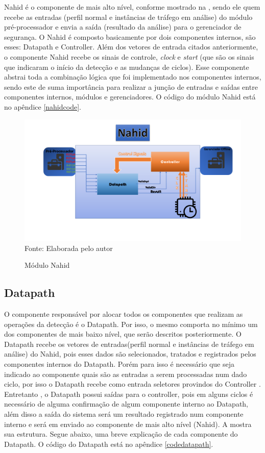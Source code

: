 Nahid é o componente de mais alto nível, conforme mostrado na , sendo ele quem recebe as entradas (perfil normal e instâncias de tráfego em análise) do módulo pré-processador e envia a saída (resultado da análise) para o gerenciador de segurança. O Nahid é composto basicamente por dois componentes  internos, são esses: Datapath e Controller.  Além dos vetores de entrada citados anteriormente, o componente  Nahid recebe os sinais de controle, \textit{clock} e \textit{start} (que são os sinais que indicaram o início da detecção e as mudanças de ciclos). Esse componente  abstrai toda a combinação lógica que foi implementado nos componentes  internos, sendo este de suma importância para realizar a junção de entradas e saídas entre componentes internos, módulos e  gerenciadores. O código do módulo Nahid está no apêndice \ref{nahidcode}.
\begin{figure}[H]
	\centering
	\caption{Módulo Nahid}
	\includegraphics[width=16cm]{figures/NahidModule.png}\\
	{Fonte: Elaborada pelo autor}
	\label{modulo}
\end{figure}

\subsection{Datapath}

O componente responsável por alocar todos os componentes que realizam as operações da detecção  é o Datapath. Por isso, o mesmo comporta no mínimo um dos componentes de mais baixo nível, que serão descritos posteriormente. O Datapath recebe os vetores de entradas(perfil normal e instâncias de tráfego em análise) do Nahid, pois esses dados são selecionados, tratados e registrados pelos componentes internos do Datapath. Porém para isso é necessário que seja indicado ao componente quais são as entradas a serem processadas num dado ciclo, por isso o Datapath recebe como entrada seletores provindos do Controller . Entretanto , o Datapath possui saídas para o controller, pois em alguns ciclos é necessário de alguma confirmação de algum componente  interno ao Datapath, além disso a saída do sistema será um resultado registrado num componente interno e será em enviado ao componente de mais alto nível (Nahid). A  mostra sua estrutura. Segue abaixo, uma breve explicação de cada componente do Datapath. O código do Datapath está no apêndice \ref{codedatapath}.


